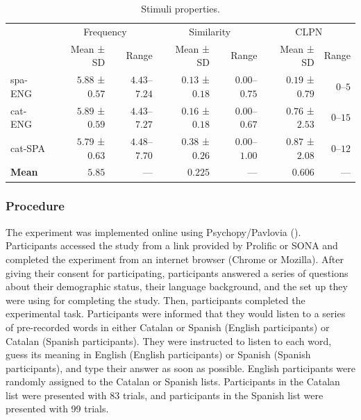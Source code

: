 \documentclass[
]{article}
\begin{document}
\begin{longtable}{l|rrrrrr}

\caption{\label{tbl-stimuli}Stimuli properties.}

\tabularnewline

\toprule
\multicolumn{1}{l}{} & \multicolumn{2}{c}{Frequency} & \multicolumn{2}{c}{Similarity} & \multicolumn{2}{c}{CLPN} \\ 
\cmidrule(lr){2-3} \cmidrule(lr){4-5} \cmidrule(lr){6-7}
\multicolumn{1}{l}{} & Mean ± SD & Range & Mean ± SD & Range & Mean ± SD & Range \\ 
\midrule\addlinespace[2.5pt]
spa-ENG & $5.88$ ± $0.57$ & $4.43$–$7.24$ & $0.13$ ± $0.18$ & $0.00$–$0.75$ & $0.19$ ± $0.79$ & $0$–$5$ \\ 
cat-ENG & $5.89$ ± $0.59$ & $4.43$–$7.27$ & $0.16$ ± $0.18$ & $0.00$–$0.67$ & $0.76$ ± $2.53$ & $0$–$15$ \\ 
cat-SPA & $5.79$ ± $0.63$ & $4.48$–$7.70$ & $0.38$ ± $0.26$ & $0.00$–$1.00$ & $0.87$ ± $2.08$ & $0$–$12$ \\ 
\midrule 
\midrule 
\textbf{Mean} & $5.85$ & — & $0.225$ & — & $0.606$ & — \\ 
\bottomrule

\end{longtable}

\subsubsection{Procedure}\label{procedure}

The experiment was implemented online using Psychopy/Pavlovia
(). Participants
accessed the study from a link provided by Prolific or SONA and
completed the experiment from an internet browser (Chrome or Mozilla).
After giving their consent for participating, participants answered a
series of questions about their demographic status, their language
background, and the set up they were using for completing the study.
Then, participants completed the experimental task. Participants were
informed that they would listen to a series of pre-recorded words in
either Catalan or Spanish (English participants) or Catalan (Spanish
participants). They were instructed to listen to each word, guess its
meaning in English (English participants) or Spanish (Spanish
participants), and type their answer as soon as possible. English
participants were randomly assigned to the Catalan or Spanish lists.
Participants in the Catalan list were presented with 83 trials, and
participants in the Spanish list were presented with 99 trials.
\end{document}
